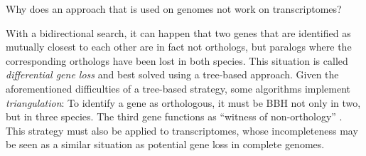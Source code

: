 Why does an approach that is used on genomes not work on transcriptomes?

With a bidirectional search, it can happen that two genes that are identified as
mutually closest to each other are in fact not orthologs, but paralogs where the
corresponding orthologs have been lost in both species. This situation is called
\emph{differential gene loss} and best solved using a tree-based approach. Given
the aforementioned difficulties of a tree-based strategy, some algorithms
implement \emph{triangulation}: To identify a gene as orthologous, it must be
BBH not only in two, but in three species. The third gene functions as ``witness
of non-orthology'' \citep{dessimoz2006}. This strategy must also be applied to
transcriptomes, whose incompleteness may be seen as a similar situation as
potential gene loss in complete genomes.

